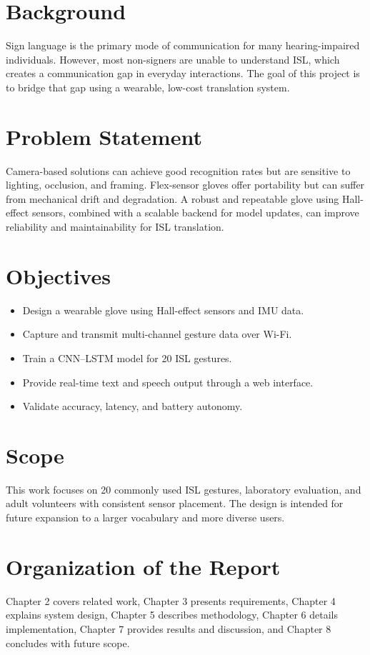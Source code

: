 \documentclass[12pt,a4paper]{report}
\begin{document}
\section{Background}
Sign language is the primary mode of communication for many hearing-impaired
individuals. However, most non-signers are unable to understand ISL, which
creates a communication gap in everyday interactions. The goal of this project
is to bridge that gap using a wearable, low-cost translation system.

\section{Problem Statement}
Camera-based solutions can achieve good recognition rates but are sensitive to
lighting, occlusion, and framing. Flex-sensor gloves offer portability but can
suffer from mechanical drift and degradation. A robust and repeatable glove
using Hall-effect sensors, combined with a scalable backend for model updates,
can improve reliability and maintainability for ISL translation.

\section{Objectives}
\begin{itemize}[noitemsep]
  \item Design a wearable glove using Hall-effect sensors and IMU data.
  \item Capture and transmit multi-channel gesture data over Wi-Fi.
  \item Train a CNN--LSTM model for 20 ISL gestures.
  \item Provide real-time text and speech output through a web interface.
  \item Validate accuracy, latency, and battery autonomy.
\end{itemize}

\section{Scope}
This work focuses on 20 commonly used ISL gestures, laboratory evaluation, and
adult volunteers with consistent sensor placement. The design is intended for
future expansion to a larger vocabulary and more diverse users.

\section{Organization of the Report}
Chapter 2 covers related work, Chapter 3 presents requirements, Chapter 4
explains system design, Chapter 5 describes methodology, Chapter 6 details
implementation, Chapter 7 provides results and discussion, and Chapter 8
concludes with future scope.
\end{document}
